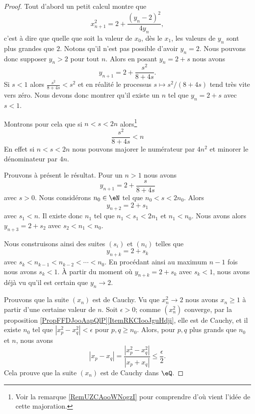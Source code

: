 \begin{proof}
    Tout d'abord un petit calcul montre que
    \begin{equation}
        x_{n+1}^2=2+\frac{ (y_n-2)^2 }{ 4y_n },
    \end{equation}
    c'est à dire que quelle que soit la valeur de \( x_0\), dès le \( x_1\), les valeurs de \( y_n\) sont plus grandes que \( 2\). Notons qu'il n'est pas possible d'avoir \( y_n=2\). Nous pouvons donc supposer \( y_n>2\) pour tout \( n\). Alors en posant \( y_n=2+s\) nous avons
    \begin{equation}
        y_{n+1}=2+\frac{ s^2 }{ 8+4s }.
    \end{equation}
    Si \( s<1\) alors \( \frac{ s^2 }{ 8+4s }<s^2\) et en réalité le processus \( s\mapsto s^2/(8+4s)\) tend très vite vers zéro. Nous devons donc montrer qu'il existe un \( n\) tel que \( y_n=2+s\) avec \( s<1\).

    Montrons pour cela que si \( n<s<2n\) alors\footnote{Voir la remarque \ref{RemUZCAooWNogzI} pour comprendre d'où vient l'idée de cette majoration.}
    \begin{equation}\label{EqYNKQooUBfhgz}
        \frac{ s^2 }{ 8+4s }<n
    \end{equation}
    En effet si \( n<s<2n\) nous pouvons majorer le numérateur par \( 4n^2\) et minorer le dénominateur par \( 4n\).

    Prouvons à présent le résultat. Pour un \( n>1\) nous avons
    \begin{equation}
        y_{n+1}=2+\frac{ s }{ 8+4s }
    \end{equation}
    avec \( s>0\). Nous considérons \( n_0\in \eN\) tel que \( n_0<s<2n_0\). Alors
    \begin{equation}
        y_{n+2}=2+s_1
    \end{equation}
    avec \( s_1<n\). Il existe donc \( n_1\) tel que \( n_1<s_1<2n_1\) et \( n_1<n_0\). Nous avons alors \( y_{n+3}=2+s_2\) avec \( s_2<n_1<n_0\).

    Nous construisons ainsi des suites \( (s_i)\) et \( (n_i)\) telles que 
    \begin{equation}
        y_{n+k}=2+s_k
    \end{equation}
    avec \( s_k<n_{k-1}<n_{k-2}<\cdots<n_0\). En procédant ainsi au maximum \( n-1\) fois nous avons \( s_k<1\). À partir du moment où \( y_{n+k}=2+s_k\) avec \( s_k<1\), nous avons déjà vu qu'il est certain que \( y_n\to 2\).

    Prouvons que la suite \( (x_n)\) est de Cauchy. Vu que \( x_n^2\to 2\) nous avons \( x_n\geq 1\) à partir d'une certaine valeur de \( n\). Soit \( \epsilon > 0 \); comme \( (x_n^2)\) converge, par la proposition \ref{PropFFDJooAapQlP}\ref{ItemRKCIooJguHdji}, elle est de Cauchy, et il existe \( n_0\) tel que \( | x_p^2-x_q^2 | < \epsilon \) pour \( p,q\geq n_0\). Alors, pour \( p,q \) plus grands que \( n_0\) et \( n\), nous avons
    \begin{equation}
        |x_p-x_q | = \frac{| x_p^2-x_q^2 |}{| x_p+x_q |} \leq \frac \epsilon 2.
    \end{equation}
    Cela prouve que la suite \( (x_n)\) est de Cauchy dans \( \eQ\).


\end{proof}
